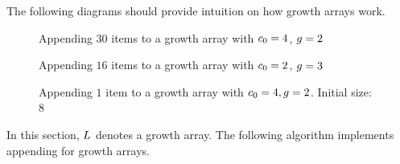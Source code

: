 \HdrGrowthArrayImpl

The following diagrams should provide intuition on how growth arrays work.

\begin{figure}[H]
	\caption{Appending $30$ items to a growth array with $c_0 = 4$, $g = 2$}
\end{figure}

\begin{figure}[H]
	\caption{Appending $16$ items to a growth array with $c_0 = 2$, $g = 3$}
\end{figure}

\begin{figure}[H]
	\caption{Appending $1$ item to a growth array with $c_0 = 4, g = 2$. Initial size: $8$}
\end{figure}

In this section, $L$ denotes a growth array. The following algorithm implements appending for growth arrays.


